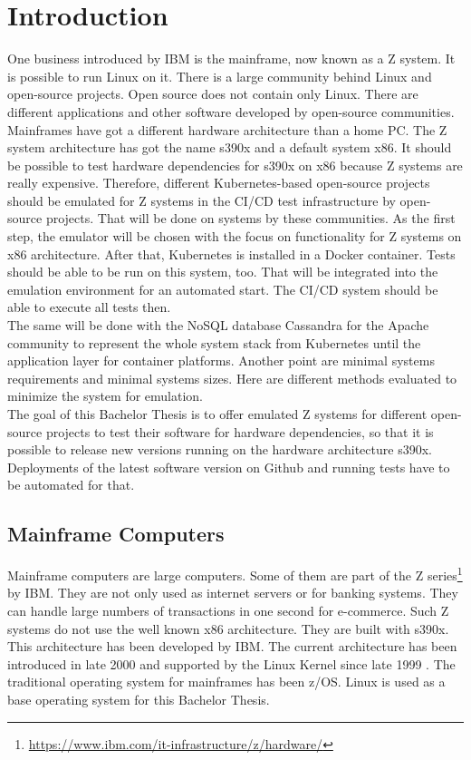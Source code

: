 \chapter{Introduction}\label{ch:intro}

One business introduced by IBM is the mainframe, now known as a Z system. It is possible to run Linux on it. 
There is a large community behind Linux and open-source projects. 
Open source does not contain only Linux. 
There are different applications and other software developed by open-source communities. 
Mainframes have got a different hardware architecture than a home PC. 
The Z system architecture has got the name s390x and a default system x86. 
It should be possible to test hardware dependencies for s390x on x86 because Z systems are really expensive. 
Therefore, different Kubernetes-based open-source projects should be emulated for Z systems in the CI/CD test infrastructure by open-source projects. That will be done on systems by these communities.
As the first step, the emulator will be chosen with the focus on functionality for Z systems on x86 architecture. 
After that, Kubernetes is installed in a Docker container. 
Tests should be able to be run on this system, too. That will be integrated into the emulation environment for an automated start. The CI/CD system should be able to execute all tests then. \\
The same will be done with the NoSQL database Cassandra for the Apache community to represent the whole system stack from Kubernetes until the application layer for container platforms. Another point are minimal systems requirements and minimal systems sizes. Here are different methods evaluated to minimize the system for emulation. \\
The goal of this Bachelor Thesis is to offer emulated Z systems for different open-source projects to test their software for hardware dependencies, so that it is possible to release new versions running on the hardware architecture s390x. Deployments of the latest software version on Github and running tests have to be automated for that.


\section{Mainframe Computers}

Mainframe computers are large computers. Some of them are part of the Z series\footnote{\url{https://www.ibm.com/it-infrastructure/z/hardware/}} by IBM. They are not only used as internet servers or for banking systems. They can handle large numbers of transactions in one second for e-commerce\cite[~p.56]{Tanenbaum2014}. Such Z systems do not use the well known x86 architecture. They are built with s390x. This architecture has been developed by IBM. The current architecture has been introduced in late 2000 and supported by the Linux Kernel since late 1999 \cite[~p.15]{Block2019}. The traditional operating system for mainframes has been z/OS. Linux is used as a base operating system for this Bachelor Thesis.


